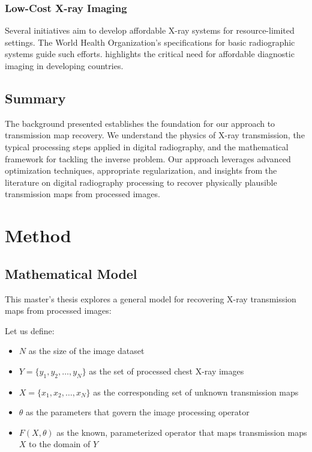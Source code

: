 \documentclass[nomenclature, english, bibtex]{kththesis}
\numberwithin{listing}{chapter}
\begin{document}
\subsection{Low-Cost X-ray Imaging}
Several initiatives aim to develop affordable X-ray systems for resource-limited settings. The World Health Organization's specifications for basic radiographic systems \cite{who2014specifications} guide such efforts. \cite{mollura2010radiology} highlights the critical need for affordable diagnostic imaging in developing countries.

\section{Summary}
The background presented establishes the foundation for our approach to transmission map recovery. We understand the physics of X-ray transmission, the typical processing steps applied in digital radiography, and the mathematical framework for tackling the inverse problem. Our approach leverages advanced optimization techniques, appropriate regularization, and insights from the literature on digital radiography processing to recover physically plausible transmission maps from processed images.
\chapter{Method}

\section{Mathematical Model}
This master's thesis explores a general model for recovering X-ray transmission maps from processed images:

Let us define:
\begin{itemize}
    \item $N$ as the size of the image dataset
    \item $Y = \{ y_{1}, y_{2}, \dots, y_{N} \}$ as the set of processed chest X-ray images
    \item $X = \{x_{1}, x_{2}, \dots, x_{N}\}$ as the corresponding set of unknown transmission maps
    \item $\theta$ as the parameters that govern the image processing operator
    \item $F(X, \theta)$ as the known, parameterized operator that maps transmission maps $X$ to the domain of $Y$
\end{itemize}
\end{document}
